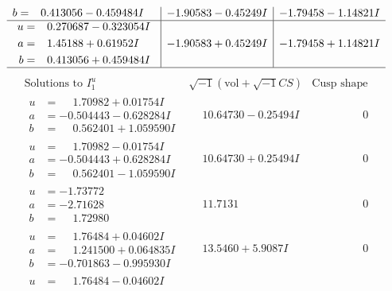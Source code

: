 \documentclass[1p]{elsarticle_modified}
\theoremstyle{definition}
\newcommand{\I}{\sqrt{-1}}
\begin{document}
$$\begin{array}{c|c|c}
\begin{aligned}
b &= \phantom{-}0.413056 - 0.459484 I\end{aligned}
 & -1.90583 - 0.45249 I & -1.79458 - 1.14821 I \\ \hline\begin{aligned}
u &= \phantom{-}0.270687 - 0.323054 I \\
a &= \phantom{-}1.45188 + 0.61952 I \\
b &= \phantom{-}0.413056 + 0.459484 I\end{aligned}
 & -1.90583 + 0.45249 I & -1.79458 + 1.14821 I\\
 \hline 
 \end{array}$$\newpage$$\begin{array}{c|c|c}  
\text{Solutions to }I^u_{1}& \I (\text{vol} + \sqrt{-1}CS) & \text{Cusp shape}\\
 \hline 
\begin{aligned}
u &= \phantom{-}1.70982 + 0.01754 I \\
a &= -0.504443 - 0.628284 I \\
b &= \phantom{-}0.562401 + 1.059590 I\end{aligned}
 & \phantom{-}10.64730 - 0.25494 I & \phantom{-0.000000 } 0 \\ \hline\begin{aligned}
u &= \phantom{-}1.70982 - 0.01754 I \\
a &= -0.504443 + 0.628284 I \\
b &= \phantom{-}0.562401 - 1.059590 I\end{aligned}
 & \phantom{-}10.64730 + 0.25494 I & \phantom{-0.000000 } 0 \\ \hline\begin{aligned}
u &= -1.73772\phantom{ +0.000000I} \\
a &= -2.71628\phantom{ +0.000000I} \\
b &= \phantom{-}1.72980\phantom{ +0.000000I}\end{aligned}
 & \phantom{-}11.7131\phantom{ +0.000000I} & \phantom{-0.000000 } 0 \\ \hline\begin{aligned}
u &= \phantom{-}1.76484 + 0.04602 I \\
a &= \phantom{-}1.241500 + 0.064835 I \\
b &= -0.701863 - 0.995930 I\end{aligned}
 & \phantom{-}13.5460 + 5.9087 I & \phantom{-0.000000 } 0 \\ \hline\begin{aligned}
u &= \phantom{-}1.76484 - 0.04602 I \\

\end{aligned}
\end{array}$$
\end{document}
